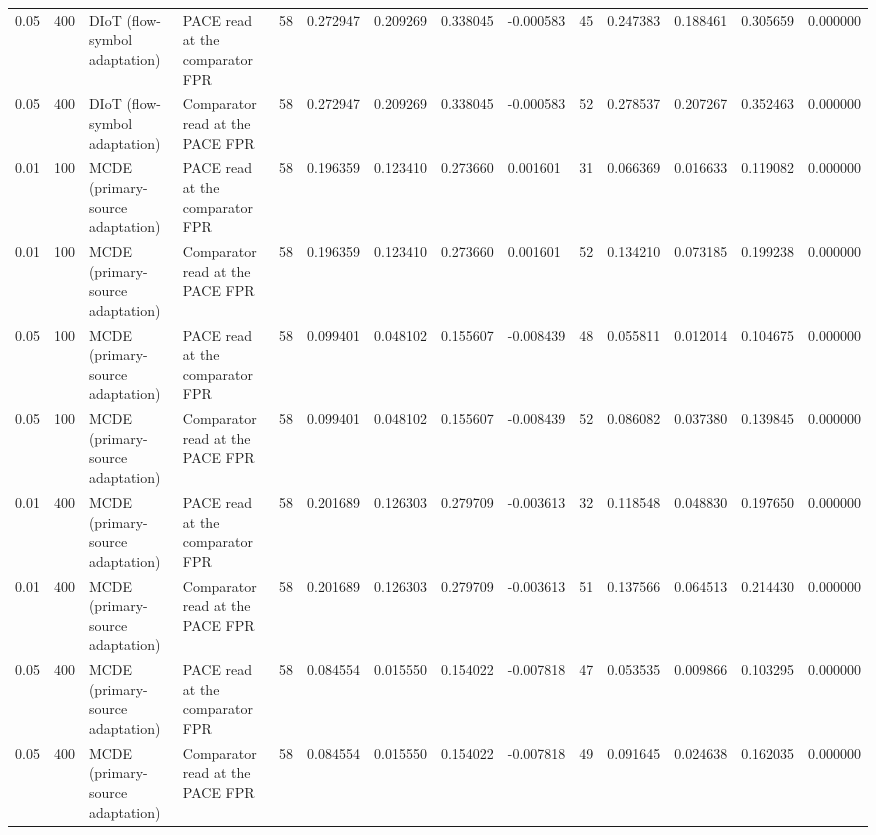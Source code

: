\begin{tabular}{llllllllllllll}
0.05 & 400 & DIoT (flow-symbol adaptation) & PACE read at the comparator FPR & 58 & 0.272947 & 0.209269 & 0.338045 & -0.000583 & 45 & 0.247383 & 0.188461 & 0.305659 & 0.000000 \\
0.05 & 400 & DIoT (flow-symbol adaptation) & Comparator read at the PACE FPR & 58 & 0.272947 & 0.209269 & 0.338045 & -0.000583 & 52 & 0.278537 & 0.207267 & 0.352463 & 0.000000 \\
0.01 & 100 & MCDE (primary-source adaptation) & PACE read at the comparator FPR & 58 & 0.196359 & 0.123410 & 0.273660 & 0.001601 & 31 & 0.066369 & 0.016633 & 0.119082 & 0.000000 \\
0.01 & 100 & MCDE (primary-source adaptation) & Comparator read at the PACE FPR & 58 & 0.196359 & 0.123410 & 0.273660 & 0.001601 & 52 & 0.134210 & 0.073185 & 0.199238 & 0.000000 \\
0.05 & 100 & MCDE (primary-source adaptation) & PACE read at the comparator FPR & 58 & 0.099401 & 0.048102 & 0.155607 & -0.008439 & 48 & 0.055811 & 0.012014 & 0.104675 & 0.000000 \\
0.05 & 100 & MCDE (primary-source adaptation) & Comparator read at the PACE FPR & 58 & 0.099401 & 0.048102 & 0.155607 & -0.008439 & 52 & 0.086082 & 0.037380 & 0.139845 & 0.000000 \\
0.01 & 400 & MCDE (primary-source adaptation) & PACE read at the comparator FPR & 58 & 0.201689 & 0.126303 & 0.279709 & -0.003613 & 32 & 0.118548 & 0.048830 & 0.197650 & 0.000000 \\
0.01 & 400 & MCDE (primary-source adaptation) & Comparator read at the PACE FPR & 58 & 0.201689 & 0.126303 & 0.279709 & -0.003613 & 51 & 0.137566 & 0.064513 & 0.214430 & 0.000000 \\
0.05 & 400 & MCDE (primary-source adaptation) & PACE read at the comparator FPR & 58 & 0.084554 & 0.015550 & 0.154022 & -0.007818 & 47 & 0.053535 & 0.009866 & 0.103295 & 0.000000 \\
0.05 & 400 & MCDE (primary-source adaptation) & Comparator read at the PACE FPR & 58 & 0.084554 & 0.015550 & 0.154022 & -0.007818 & 49 & 0.091645 & 0.024638 & 0.162035 & 0.000000 \\
\bottomrule
\end{tabular}
